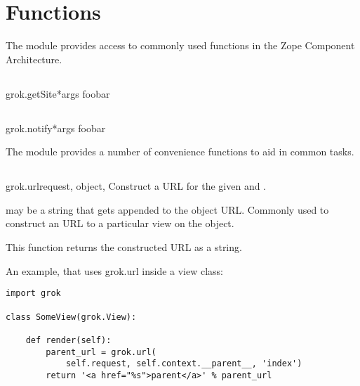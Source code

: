 \chapter{Functions}

The  module provides access to commonly used functions in the
Zope Component Architecture.

    \section{}

        \begin{funcdesc}{grok.getSite}{*args}
        foobar
        \end{funcdesc}

    \section{}

        \begin{funcdesc}{grok.notify}{*args}
        foobar
        \end{funcdesc}

The  module provides a number of convenience functions to aid in
common tasks.

    \section{}

        \begin{funcdesc}{grok.url}{request, object, }
        Construct a URL for the given  and .

         may be a string that gets appended to the object URL.
        Commonly used to construct an URL to a particular view on the object.

        This function returns the constructed URL as a string.

        An example, that uses grok.url inside a view class:
        \begin{verbatim}
import grok

class SomeView(grok.View):

    def render(self):
        parent_url = grok.url(
            self.request, self.context.__parent__, 'index')
        return '<a href="%s">parent</a>' % parent_url
        \end{verbatim}

        \end{funcdesc}
